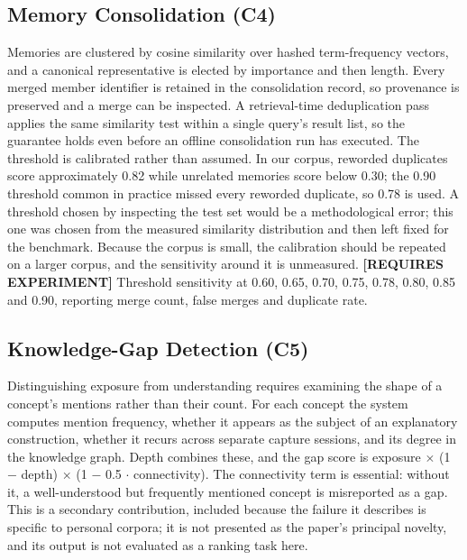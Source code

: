 \documentclass[conference]{IEEEtran}
\begin{document}
\subsection{Memory Consolidation (C4)}
Memories are clustered by cosine similarity over hashed term-frequency vectors, and a canonical representative is elected by importance and then length. Every merged member identifier is retained in the consolidation record, so provenance is preserved and a merge can be inspected. A retrieval-time deduplication pass applies the same similarity test within a single query's result list, so the guarantee holds even before an offline consolidation run has executed.
The threshold is calibrated rather than assumed. In our corpus, reworded duplicates score approximately 0.82 while unrelated memories score below 0.30; the 0.90 threshold common in practice missed every reworded duplicate, so 0.78 is used. A threshold chosen by inspecting the test set would be a methodological error; this one was chosen from the measured similarity distribution and then left fixed for the benchmark. Because the corpus is small, the calibration should be repeated on a larger corpus, and the sensitivity around it is unmeasured.
\textbf{[REQUIRES EXPERIMENT]} Threshold sensitivity at 0.60, 0.65, 0.70, 0.75, 0.78, 0.80, 0.85 and 0.90, reporting merge count, false merges and duplicate rate.
\subsection{Knowledge-Gap Detection (C5)}
Distinguishing exposure from understanding requires examining the shape of a concept's mentions rather than their count. For each concept the system computes mention frequency, whether it appears as the subject of an explanatory construction, whether it recurs across separate capture sessions, and its degree in the knowledge graph. Depth combines these, and the gap score is exposure $\times$ (1 $-$ depth) $\times$ (1 $-$ 0.5 $\cdot$ connectivity). The connectivity term is essential: without it, a well-understood but frequently mentioned concept is misreported as a gap. This is a secondary contribution, included because the failure it describes is specific to personal corpora; it is not presented as the paper's principal novelty, and its output is not evaluated as a ranking task here.
\end{document}
